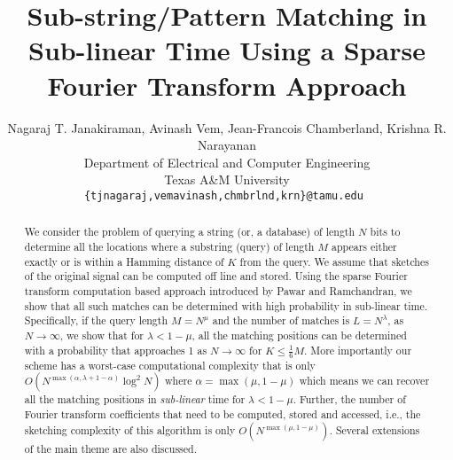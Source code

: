 \documentclass[sigconf]{acmart}
\begin{document}
\title[Sub-string Matching in Sub-linear Time]{Sub-string/Pattern Matching in Sub-linear Time Using a Sparse Fourier Transform Approach}

\author{Nagaraj T. Janakiraman, Avinash Vem, Jean-Francois Chamberland, Krishna R. Narayanan\\
Department of Electrical and Computer Engineering \\
Texas A\&M University\\
{\tt\small {\{tjnagaraj,vemavinash,chmbrlnd,krn\}@tamu.edu} }}

%
%
\renewcommand{\shortauthors}{Janakiraman et al.}

\begin{abstract}
	We consider the problem of querying a string (or, a database) of length $N$ bits to determine all the locations where a substring (query) of length $M$ appears either exactly or is within a Hamming distance of $K$ from the query. We assume that sketches of the original signal can be computed off line and stored. Using the sparse Fourier transform computation based approach introduced by Pawar and Ramchandran, we show that all such matches can be determined with high probability in sub-linear time. Specifically, if the query length $M = N^\mu$ and the number of matches is $L=N^\lambda$, as $N\rightarrow \infty$, we show that  for $\lambda < 1-\mu$, all the matching positions can be determined with a probability that approaches 1 as $N \rightarrow \infty$ for $K \leq \frac{1}{6}M$. More importantly our scheme has a worst-case computational complexity that is only $O\left(N^{\max(\alpha,\lambda+1-\alpha)} \log^2 N \right)$ where $\alpha=\max(\mu,1-\mu)$ which means we can recover all the matching positions in {\it sub-linear} time for $\lambda<1-\mu$. Further, the number of Fourier transform coefficients that need to be computed, stored and accessed, i.e., the sketching complexity of this algorithm is only $O\left( N^{\max(\mu,1-\mu)}\right)$. Several extensions of the main theme are also discussed.
\end{abstract}
\end{document}
